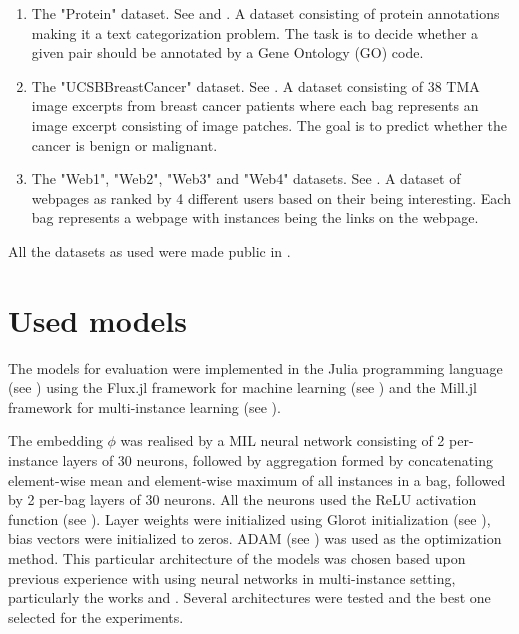 \begin{enumerate}
  \item The "Protein" dataset. See \cite{ray_learning_2005} and \cite{ray_supervised_2005}. A dataset consisting of protein annotations making it a text categorization problem. The task is to decide whether a given pair should be annotated by a Gene Ontology (GO) code.
  \item The "UCSBBreastCancer" dataset. See \cite{kandemir_empowering_2014}. A dataset consisting of 38 TMA image excerpts from breast cancer patients where each bag represents an image excerpt consisting of image patches. The goal is to predict whether the cancer is benign or malignant.
  \item The "Web1", "Web2", "Web3" and "Web4" datasets. See \cite{zhou_multi-instance_2005}. A dataset of webpages as ranked by 4 different users based on their being interesting. Each bag represents a webpage with instances being the links on the webpage.
\end{enumerate}

All the datasets as used were made public in \cite{dedic_mildatasetsjl_2019}.

\section{Used models}

The models for evaluation were implemented in the Julia programming language (see \cite{bezanson_julia:_2017}) using the Flux.jl framework for machine learning (see \cite{innes_flux:_2018}) and the Mill.jl framework for multi-instance learning (see \cite{pevny_milljl_2019}).

The embedding \( \phi \) was realised by a MIL neural network consisting of 2 per-instance layers of 30 neurons, followed by aggregation formed by concatenating element-wise mean and element-wise maximum of all instances in a bag, followed by 2 per-bag layers of 30 neurons. All the neurons used the ReLU activation function (see \cite{hahnloser_digital_2000}). Layer weights were initialized using Glorot initialization (see \cite{glorot_understanding_2010}), bias vectors were initialized to zeros. ADAM (see \cite{kingma_adam:_2014}) was used as the optimization method. This particular architecture of the models was chosen based upon previous experience with using neural networks in multi-instance setting, particularly the works \cite{dedic_hierarchicke_2017} and \cite{pevny_nested_2020}. Several architectures were tested and the best one selected for the experiments.


